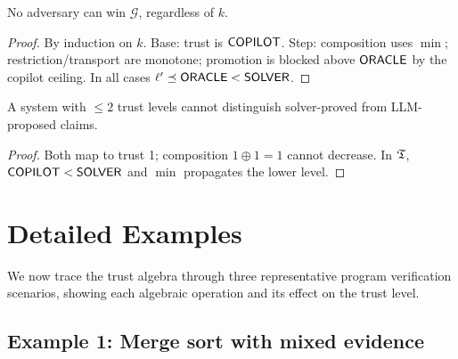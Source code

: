 \documentclass[11pt]{article}
\begin{document}
\begin{theorem}\label{thm:adversarial}
No adversary can win $\mathcal{G}$, regardless of $k$.
\end{theorem}

\begin{proof}
By induction on $k$.  Base: trust is $\mathsf{COPILOT}$.
Step: composition uses $\min$; restriction/transport are
monotone; promotion is blocked above $\mathsf{ORACLE}$ by the
copilot ceiling.  In all cases $\ell' \preceq \mathsf{ORACLE} < \mathsf{SOLVER}$.
\end{proof}

\begin{theorem}\label{thm:flat}
A system with $\leq 2$ trust levels cannot distinguish
solver-proved from LLM-proposed claims.
\end{theorem}

\begin{proof}
Both map to trust 1; composition $1 \oplus 1 = 1$ cannot
decrease.  In $\mathfrak{T}$, $\mathsf{COPILOT} < \mathsf{SOLVER}$ and $\min$
propagates the lower level.
\end{proof}


\section{Detailed Examples}\label{sec:examples}

We now trace the trust algebra through three representative
program verification scenarios, showing each algebraic
operation and its effect on the trust level.

\subsection{Example 1: Merge sort with mixed evidence}
\label{sec:ex-mergesort}
\end{document}
